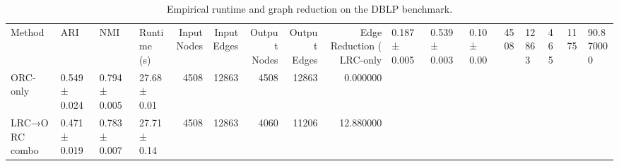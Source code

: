 \begin{table}
\caption{Empirical runtime and graph reduction on the DBLP benchmark.}
\label{tab:dblp_empirical_complexity}
\begin{tabular}{llllrrrrr}
\toprule
Method & ARI & NMI & Runtime (s) & Input Nodes & Input Edges & Output Nodes & Output Edges & Edge Reduction (%
\midrule
LRC-only & 0.187 ± 0.005 & 0.539 ± 0.003 & 0.10 ± 0.00 & 4508 & 12863 & 465 & 1175 & 90.870000 \\
ORC-only & 0.549 ± 0.024 & 0.794 ± 0.005 & 27.68 ± 0.01 & 4508 & 12863 & 4508 & 12863 & 0.000000 \\
LRC→ORC combo & 0.471 ± 0.019 & 0.783 ± 0.007 & 27.71 ± 0.14 & 4508 & 12863 & 4060 & 11206 & 12.880000 \\
\bottomrule
\end{tabular}
\end{table}
